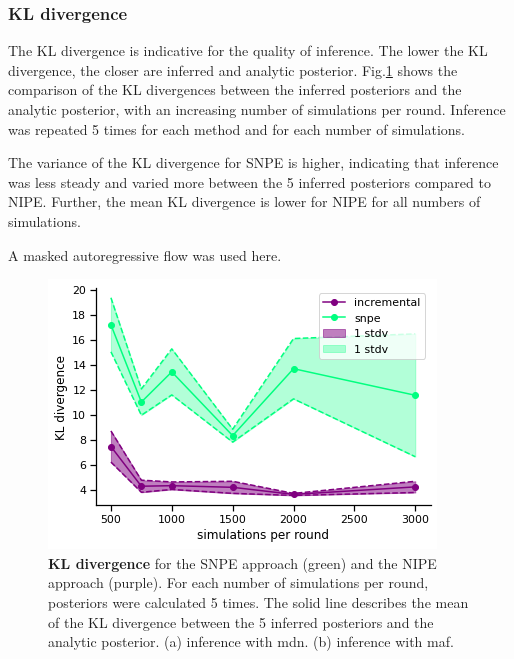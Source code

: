 \documentclass[12pt]{extreport}
\begin{document}
\subsubsection{KL divergence}
\label{sec:results_kl}
The KL divergence is indicative for the quality of inference. The lower the KL divergence, the closer are inferred and analytic posterior. 
Fig.\ref{kldiv2} shows the comparison of the KL divergences between the inferred posteriors and the analytic posterior, with an increasing number of simulations per round. Inference was repeated 5 times for each method and for each number of simulations.

 The variance of the KL divergence for SNPE is higher, indicating that inference was less steady and varied more between the 5 inferred posteriors compared to NIPE. Further, the mean KL divergence is lower for NIPE for all numbers of simulations.
 
 A masked autoregressive flow \citep{papamakarios2017masked} was used here.


\begin{figure}
 \centering
        \includegraphics[width=0.5\linewidth]{images/thesis_fig4_1.png}

        
\caption{\label{kldiv2}\textbf{KL divergence} \small for the SNPE approach (green) and the NIPE approach (purple). For each number of simulations per round, posteriors were calculated 5 times. The solid line describes the mean of the KL divergence between the 5 inferred posteriors and the analytic posterior. (a) inference with mdn. (b) inference with maf. }

\end{figure}
\end{document}
